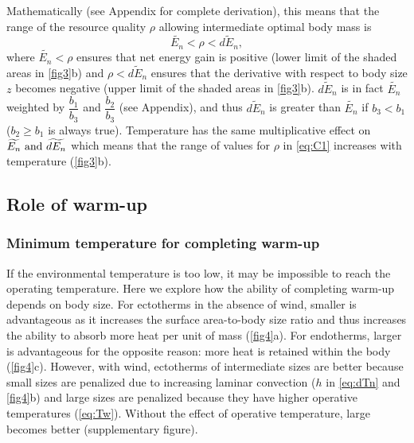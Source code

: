 Mathematically (see Appendix for complete derivation), this means that the range of the resource quality $\rho$ allowing intermediate optimal body mass is 
\begin{equation}\label{eq:C1}
	\widetilde{E_n} < \rho < \widetilde{dE_n},
\end{equation}
where $\widetilde{E_n} < \rho $ ensures that net energy gain is positive (lower limit of the shaded areas in \cref{fig3}b) and $\rho < \widetilde{dE_n}$ ensures that the derivative with respect to body size $z$ becomes negative (upper limit of the shaded areas in \cref{fig3}b).
$\widetilde{dE_n}$ is in fact $\widetilde{E_n}$ weighted by $\dfrac{b_1}{b_3}$  and $\dfrac{b_2}{b_3}$ (see Appendix), and thus $\widetilde{dE_n}$ is greater than $\widetilde{E_n}$ if  $b_3 < b_1$ ($b_2 \geq b_1$ is always true). 
Temperature has the same multiplicative effect on $\widetilde{E_n}\textnormal{ and }\widetilde{dE_n}$ which means that the range of values for $\rho$ in \cref{eq:C1} increases with temperature (\cref{fig3}b).

\subsection*{Role of warm-up}
\subsubsection*{Minimum temperature for completing warm-up}
If the environmental temperature is too low, it may be impossible to reach the operating temperature. 
Here we explore how the ability of completing warm-up depends on body size.
For ectotherms in the absence of wind, smaller is advantageous as it increases the surface area-to-body size ratio and thus increases the ability to absorb more heat per unit of mass  (\cref{fig4}a). 
For endotherms, larger is advantageous for the opposite reason: more heat is retained within the body  (\cref{fig4}c). 
However, with wind, ectotherms of intermediate sizes are better because small sizes are penalized due to increasing laminar convection ($h$ in \cref{eq:dTn} and \cref{fig4}b)  and large sizes are penalized because they have higher operative temperatures (\cref{eq:Tw}). 
Without the effect of operative temperature, large becomes better (supplementary figure).
